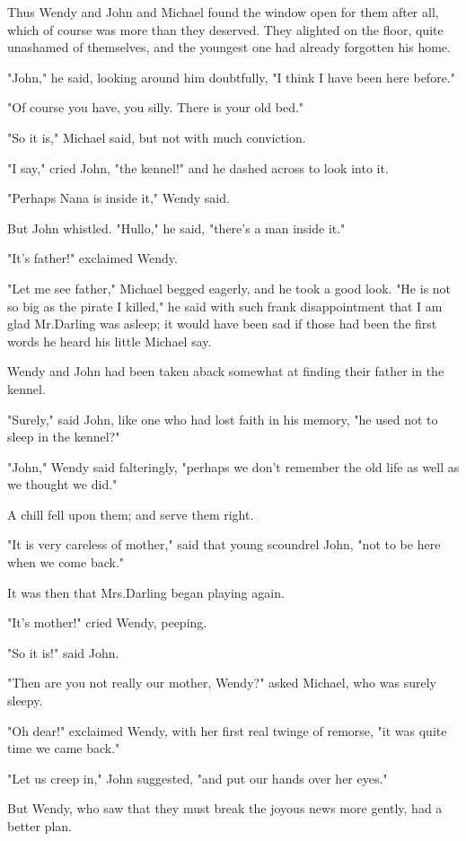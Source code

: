 Thus Wendy and John and Michael found the window open for them after all, which of course was more than they deserved.
They alighted on the floor, quite unashamed of themselves, and the youngest one had already forgotten his home.

"John," he said, looking around him doubtfully, "I think I have been here before."

"Of course you have, you silly.
There is your old bed."

"So it is," Michael said, but not with much conviction.

"I say," cried John, "the kennel!\@" and he dashed across to look into it.

"Perhaps Nana is inside it," Wendy said.

But John whistled.
"Hullo," he said, "there's a man inside it."

"It's father!\@" exclaimed Wendy.

"Let me see father," Michael begged eagerly, and he took a good look.
"He is not so big as the pirate I killed," he said with such frank disappointment that I am glad Mr.\@ Darling was asleep;
it would have been sad if those had been the first words he heard his little Michael say.

Wendy and John had been taken aback somewhat at finding their father in the kennel.

"Surely," said John, like one who had lost faith in his memory, "he used not to sleep in the kennel?"

"John," Wendy said falteringly, "perhaps we don't remember the old life as well as we thought we did."

A chill fell upon them;
and serve them right.

"It is very careless of mother," said that young scoundrel John, "not to be here when we come back."

It was then that Mrs.\@ Darling began playing again.

"It's mother!\@" cried Wendy, peeping.

"So it is!\@" said John.

"Then are you not really our mother, Wendy?\@" asked Michael, who was surely sleepy.

"Oh dear!\@" exclaimed Wendy, with her first real twinge of remorse, "it was quite time we came back."

"Let us creep in," John suggested, "and put our hands over her eyes."

But Wendy, who saw that they must break the joyous news more gently, had a better plan.


